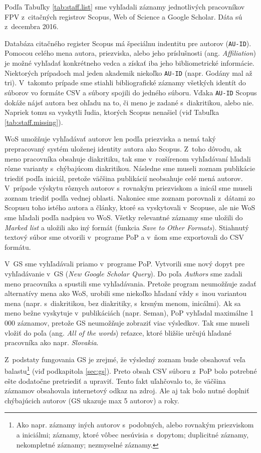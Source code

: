 Podľa Tabuľky \ref{tab:staff.list} sme vyhľadali záznamy jednotlivých
pracovníkov FPV z~citačných registrov Scopus, Web of Science a Google Scholar.
Dáta sú z~decembra 2016.

Databáza citačného register Scopus má špeciálnu indentitu pre autorov
(\texttt{AU-ID}).  Pomocou celého mena autora, priezviska, alebo jeho
príslušnosti (ang.  \emph{Affiliation}) je možné vyhľadať konkrétneho vedca a
získať iba jeho bibliometrické informácie. Niektorých prípadoch mal jeden
akademik niekoľko \texttt{AU-ID} (napr. Godány mal až tri). V~takomto prípade
sme stiahli bibliografické záznamy všetkých identít do súborov vo formáte CSV a
súbory spojili do jedného súboru.  Vďaka \texttt{AU-ID} Scopus dokáže nájsť
autora bez ohľadu na to, či meno je zadané s~diakritikou, alebo nie.  Napriek
tomu sa vyskytli ľudia, ktorých Scopus nenašiel (viď Tabuľka
\ref{tab:staff.missing}).

WoS umožňuje vyhľadávať autorov len podľa priezviska a nemá taký prepracovaný
systém uloženej identity autora ako Scopus. Z~toho dôvodu, ak meno pracovníka
obsahuje diakritiku, tak sme v~rozšírenom vyhľadávaní hľadali rôzne varianty
s~chýbajúcom diakritikou. Následne sme museli zoznam publikácie triediť podľa
iniciál, pretože väčšina publikácií neobsahuje celé mená autorov. V~prípade
výskytu rôznych autorov s~rovnakým priezviskom a inicál sme museli zoznam
triediť podľa vednej oblasti. Nakoniec sme zoznam porovnali z~dátami zo Scopusu
toho istého autora a články, ktoré sa vyskytovali v~Scopuse, ale nie WoS sme
hľadali podľa nadpisu vo WoS. Všetky relevantné záznamy sme uložili do
\emph{Marked list} a uložili ako iný formát (funkcia \emph{Save to Other
  Formats}). Stiahnutý textový súbor sme otvorili v~programe PoP a v~ňom sme
exportovali do CSV formátu.

V~GS sme vyhľadávali priamo v~programe PoP. Vytvorili sme nový dopyt pre
vyhľadávanie v~GS (\emph{New Google Scholar Query}). Do poľa \emph{Authors} sme
zadali meno pracovníka a spustili sme vyhľadávania. Pretože program neumožňuje
zadať alternatívy mena ako WoS, urobili sme niekoľko hľadaní vždy s~inou
variantou mena (napr. s~diakritikou, bez diakritiky, s~krsným menom, inicálmi).
Ak sa meno bežne vyskytuje v~publikáciách (napr. Seman), PoP vyhľadal maximálne
1\,000 záznamov, pretože GS neumožňuje zobraziť viac výsledkov. Tak sme museli
vložiť do poľa  (ang. \emph{All of the words}) reťazce, ktoré
bližšie určujú hľadané pracovníka ako napr.  \emph{Slovakia}.

Z~podstaty fungovania GS je zrejmé, že výsledný zoznam bude obsahovať veľa
balastu\footnote{Ako napr. záznamy iných autorov s~podobných, alebo rovnakým
  priezviskom a iniciálmi; záznamy, ktoré vôbec nesúvisia s~dopytom; duplicitné
  záznamy, nekompletné záznamy; nezmyselné záznamy.} (viď podkapitola
\ref{sec:gs}).  Preto obsah CSV súboru z~PoP bolo potrebné ešte dodatočne
pretriediť a upraviť. Tento fakt uľahčovalo to, že väčšina záznamov obsahovala
internetový odkaz na zdroj. Ale aj tak bolo nutné doplniť chýbajúcich autorov
(GS ukazuje max 5 autorov) a roky.


